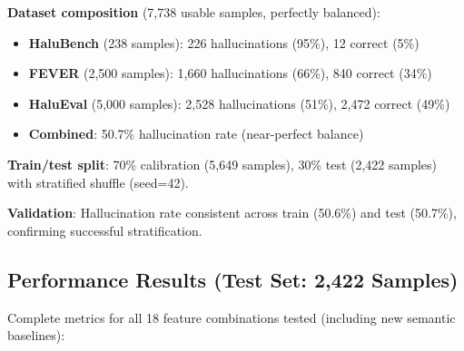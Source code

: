 \documentclass[11pt]{article}
\begin{document}
\textbf{Dataset composition} (7,738 usable samples, perfectly balanced):
\begin{itemize}
\item \textbf{HaluBench} (238 samples): 226 hallucinations (95\%), 12 correct (5\%)
\item \textbf{FEVER} (2,500 samples): 1,660 hallucinations (66\%), 840 correct (34\%)
\item \textbf{HaluEval} (5,000 samples): 2,528 hallucinations (51\%), 2,472 correct (49\%)
\item \textbf{Combined}: 50.7\% hallucination rate (near-perfect balance)
\end{itemize}

\textbf{Train/test split}: 70\% calibration (5,649 samples), 30\% test (2,422 samples) with stratified shuffle (seed=42).

\textbf{Validation}: Hallucination rate consistent across train (50.6\%) and test (50.7\%), confirming successful stratification.

\subsection{Performance Results (Test Set: 2,422 Samples)}

Complete metrics for all 18 feature combinations tested (including new semantic baselines):
\end{document}
